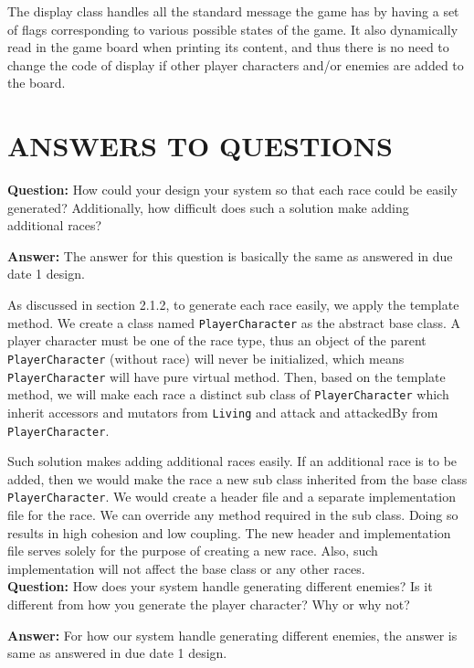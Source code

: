 \documentclass[11pt]{article}
\theoremstyle{plain} \newtheorem{theorem*}{Theorem}[subsection]
\begin{document}
The display class handles all the standard message the game has by having a set
of flags corresponding to various possible states of the game. It also
dynamically read in the game board when printing its content, and thus there is
no need to change the code of display if other player characters and/or enemies
are added to the board.  

\vspace{0.3 in}
\section{ANSWERS TO QUESTIONS}

\textbf{Question:}
How could your design your system so that each race could be easily generated?
Additionally, how difficult does such a solution make adding additional races? 

\textbf{Answer:}
The answer for this question is basically the same as answered in due date 1
design. 

As discussed in section 2.1.2, to generate each race easily, 
we apply the template method.
We create a class named \texttt{PlayerCharacter} as the abstract base
class. A player character must be one of the race type, thus an object of the
parent \texttt{PlayerCharacter} (without race) will never be initialized, which 
means \texttt{PlayerCharacter} will have pure virtual method. Then, based on 
the template method, we will make each race a distinct sub class of 
\texttt{PlayerCharacter} which inherit accessors and mutators from 
\texttt{Living} and \textsf{attack} and \textsf{attackedBy} from 
\texttt{PlayerCharacter}.

Such solution makes adding additional races easily. If an additional race is to
be added, then we would make the race a new sub class inherited from the base
class \texttt{PlayerCharacter}. We would create a header file and a separate 
implementation file for the race. We can override any method required in the 
sub class. Doing so results in high cohesion and low coupling. The new header 
and implementation file serves solely for the purpose of creating a new race.
Also, such implementation will not affect the base class or any other races.	\\

\textbf{Question:}
How does your system handle generating different enemies? Is it different from
how you generate the player character? Why or why not? 

\textbf{Answer:}
For how our system handle generating different enemies, the answer is same as
answered in due date 1 design. 
\end{document}
